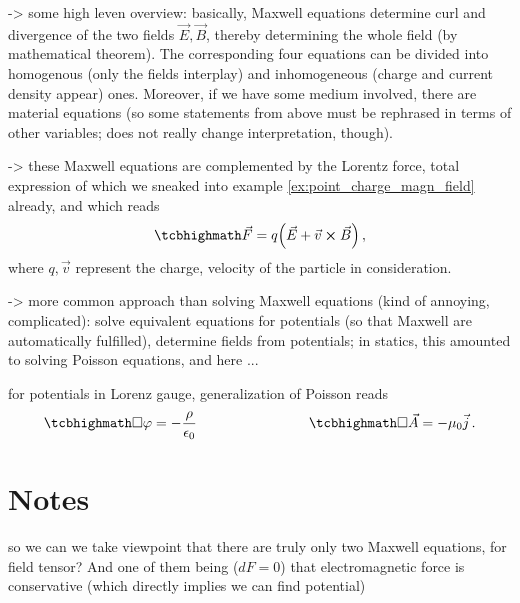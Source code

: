 \documentclass[../class_mech_main.tex]{subfiles}
\begin{document}

-> some high leven overview: basically, Maxwell equations determine curl and divergence of the two fields $\vec{E}, \vec{B}$, thereby determining the whole field (by mathematical theorem). The corresponding four equations can be divided into homogenous (only the fields interplay) and inhomogeneous (charge and current density appear) ones. Moreover, if we have some medium involved, there are material equations (so some statements from above must be rephrased in terms of other variables; does not really change interpretation, though).

-> these Maxwell equations are complemented by the Lorentz force, total expression of which we sneaked into example \ref{ex:point_charge_magn_field} already, and which reads
\begin{equation}
    \eqbox{
        \vec{F} = q \qty(\vec{E} + \vec{v} \cross \vec{B})
    } \, ,
\end{equation}
where $q, \vec{v}$ represent the charge, velocity of the particle in consideration.


-> more common approach than solving Maxwell equations (kind of annoying, complicated): solve equivalent equations for potentials (so that Maxwell are automatically fulfilled), determine fields from potentials; in statics, this amounted to solving Poisson equations, and here ...

for potentials in Lorenz gauge, generalization of Poisson reads
\begin{equation}
    \eqbox{
        \square \varphi = - \frac{\rho}{\epsilon_0}
    }
    \manyqquad
    \eqbox{
        \square \vec{A} = - \mu_0 \vec{j}
    } \, .
\end{equation}



    \section{Notes}

so we can we take viewpoint that there are truly only two Maxwell equations, for field tensor? And one of them being ($dF = 0$) that electromagnetic force is conservative (which directly implies we can find potential)
\end{document}
